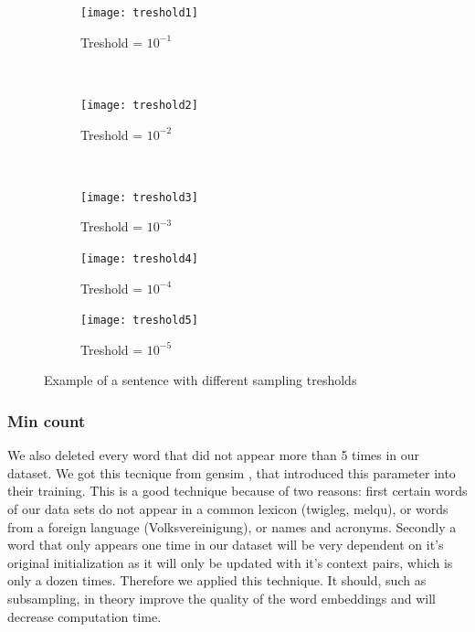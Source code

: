 \begin{figure}
    \centering
    \begin{subfigure}[b]{\textwidth}
        \texttt{[image: treshold1]}
        \caption{Treshold = $10^{-1}$}
        \label{fig:treshold1}
    \end{subfigure}
    ~ %
    \begin{subfigure}[b]{\textwidth}
        \texttt{[image: treshold2]}
        \caption{Treshold = $10^{-2}$}
        \label{fig:treshold2}
    \end{subfigure}
    ~ %
     \begin{subfigure}[b]{\textwidth}
        \texttt{[image: treshold3]}
        \caption{Treshold = $10^{-3}$}
        \label{fig:treshold3}
    \end{subfigure}
   \begin{subfigure}[b]{\textwidth}
        \texttt{[image: treshold4]}
        \caption{Treshold = $10^{-4}$}
        \label{fig:treshold4}
    \end{subfigure}
     \begin{subfigure}[b]{\textwidth}
        \texttt{[image: treshold5]}
        \caption{Treshold = $10^{-5}$}
        \label{fig:treshold5}
    \end{subfigure}
    \caption{Example of a sentence with different sampling tresholds}\label{fig:treshold_examples}
\end{figure}

\subsubsection{Min count}
We also deleted every word that did not appear more than 5 times in our dataset. We got this tecnique from gensim \cite{gensim}, that introduced this parameter into their training. This is a good technique because of two reasons: first certain words of our data sets do not appear in a common lexicon (twigleg, melqu), or words from a foreign language (Volksvereinigung), or names and acronyms. Secondly a word that only appears one time in our dataset will be very dependent on it's original initialization as it will only be updated with it's context pairs, which is only a dozen times. Therefore we applied this technique. It should, such as subsampling, in theory improve the quality of the word embeddings and  will decrease computation time. 

